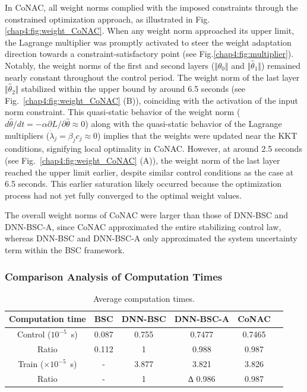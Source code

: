 In CoNAC, all weight norms complied with the imposed constraints through the constrained optimization approach, as illustrated in Fig.\ref{chap4:fig:weight_CoNAC}. When any weight norm approached its upper limit, the Lagrange multiplier was promptly activated to steer the weight adaptation direction towards a constraint-satisfactory point (see Fig.\ref{chap4:fig:multiplier}). Notably, the weight norms of the first and second layers ($\Vert {{{\hat \theta }_0}} \Vert$ and $\Vert {{{\hat \theta }_1}} \Vert$) remained nearly constant throughout the control period. The weight norm of the last layer $\Vert {{{\hat \theta }_2}} \Vert$ stabilized within the upper bound by around 6.5 seconds (see Fig.~\ref{chap4:fig:weight_CoNAC} (B)), coinciding with the activation of the input norm constraint. This quasi-static behavior of the weight norm (\ie $d{\hat\theta}/dt=-\alpha\partial L/\partial \hat\theta \approx 0$) along with the quasi-static behavior of the Lagrange multipliers (\ie $\dot\lambda_j = \beta_j c_j \approx 0$) implies that the weights were updated near the KKT conditions, signifying local optimality in CoNAC. However, at around 2.5 seconds (see Fig.~\ref{chap4:fig:weight_CoNAC} (A)), the weight norm of the last layer reached the upper limit earlier, despite similar control conditions as the case at 6.5 seconds. This earlier saturation likely occurred because the optimization process had not yet fully converged to the optimal weight values.

The overall weight norms of CoNAC were larger than those of DNN-BSC and DNN-BSC-A, since CoNAC approximated the entire stabilizing control law, whereas DNN-BSC and DNN-BSC-A only approximated the system uncertainty term within the BSC framework.

\subsubsection{Comparison Analysis of Computation Times}

\begin{table}[!t]
    \renewcommand{\arraystretch}{1.3}
    \caption{Average computation times.}
    \centering
    \begin{tabular}{|c||c|c|c|c|c|}
    \hline
    Computation time & \textbf{BSC} & \textbf{DNN-BSC} & \textbf{DNN-BSC-A} & \textbf{CoNAC} \\
    \hline 
    Control ($10^{-5}$~s) & 0.087 & 0.755 & 0.7477 & 0.7465 \\
    \hline
    Ratio & 0.112 & 1 & 0.988 & 0.987 \\
    \hline
    Train ($\times 10^{-5}$~s) & - & 3.877 & 3.821 & 3.826 \\
    \hline
    Ratio & - & 1 &∆ 0.986 & 0.987 \\ 
    \hline
    \end{tabular}
    \label{chap4:table:comp_time}
\end{table}

